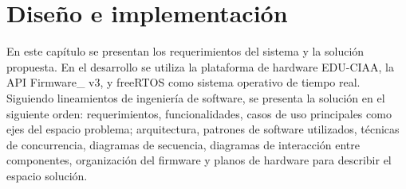 \chapter{Diseño e implementación} %

En este capítulo se presentan los requerimientos del sistema y la solución propuesta. En el desarrollo se utiliza la plataforma de hardware EDU-CIAA\cite{CIAA}, la API Firmware\_ v3\cite{firmwareV3}, y freeRTOS\cite{freeRTOS} como sistema operativo de tiempo real.\\

Siguiendo lineamientos de ingeniería de software, se presenta la solución en el siguiente orden: requerimientos, funcionalidades, casos de uso principales como ejes del espacio problema; arquitectura, patrones de software utilizados, técnicas de concurrencia, diagramas de secuencia, diagramas de interacción entre componentes, organización del firmware y planos de hardware para describir el espacio solución.\\


\label{Chapter3} %


